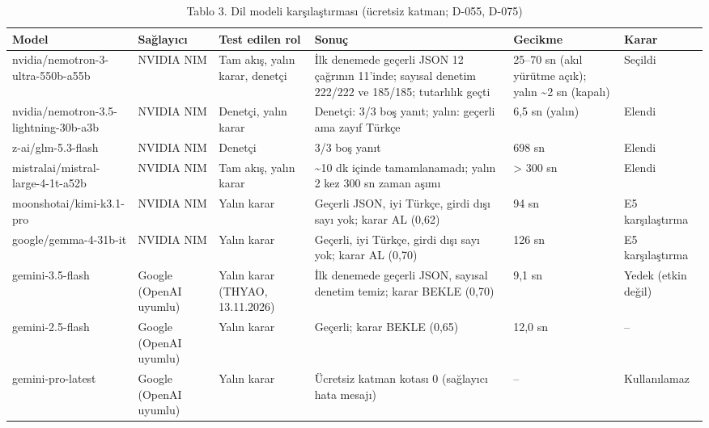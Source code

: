 \begin{table}
\caption{Tablo 3. Dil modeli karşılaştırması (ücretsiz katman; D-055, D-075)}
\label{tab:tablo_03_llm_model_karsilastirmasi}
\begin{tabular}{llllll}
\toprule
Model & Sağlayıcı & Test edilen rol & Sonuç & Gecikme & Karar \\
\midrule
nvidia/nemotron-3-ultra-550b-a55b & NVIDIA NIM & Tam akış, yalın karar, denetçi & İlk denemede geçerli JSON 12 çağrının 11'inde; sayısal denetim 222/222 ve 185/185; tutarlılık geçti & 25–70 sn (akıl yürütme açık); yalın \textasciitilde 2 sn (kapalı) & Seçildi \\
nvidia/nemotron-3.5-lightning-30b-a3b & NVIDIA NIM & Denetçi, yalın karar & Denetçi: 3/3 boş yanıt; yalın: geçerli ama zayıf Türkçe & 6,5 sn (yalın) & Elendi \\
z-ai/glm-5.3-flash & NVIDIA NIM & Denetçi & 3/3 boş yanıt & 698 sn & Elendi \\
mistralai/mistral-large-4-1t-a52b & NVIDIA NIM & Tam akış, yalın karar & \textasciitilde 10 dk içinde tamamlanamadı; yalın 2 kez 300 sn zaman aşımı & > 300 sn & Elendi \\
moonshotai/kimi-k3.1-pro & NVIDIA NIM & Yalın karar & Geçerli JSON, iyi Türkçe, girdi dışı sayı yok; karar AL (0,62) & 94 sn & E5 karşılaştırma \\
google/gemma-4-31b-it & NVIDIA NIM & Yalın karar & Geçerli, iyi Türkçe, girdi dışı sayı yok; karar AL (0,70) & 126 sn & E5 karşılaştırma \\
gemini-3.5-flash & Google (OpenAI uyumlu) & Yalın karar (THYAO, 13.11.2026) & İlk denemede geçerli JSON, sayısal denetim temiz; karar BEKLE (0,70) & 9,1 sn & Yedek (etkin değil) \\
gemini-2.5-flash & Google (OpenAI uyumlu) & Yalın karar & Geçerli; karar BEKLE (0,65) & 12,0 sn & – \\
gemini-pro-latest & Google (OpenAI uyumlu) & Yalın karar & Ücretsiz katman kotası 0 (sağlayıcı hata mesajı) & – & Kullanılamaz \\
\bottomrule
\end{tabular}
\end{table}
